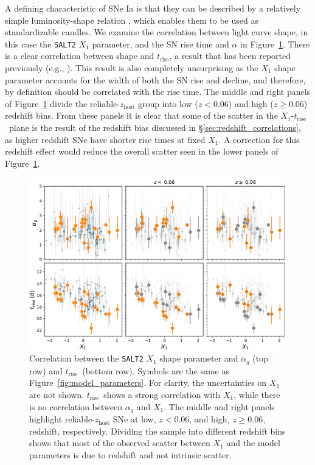 \documentclass[twocolumn]{./aastex63}
\newcommand{\trise}{$t_\mathrm{rise}$}
\begin{document}
A defining characteristic of SNe Ia is that they can be described by a
relatively simple luminosity-shape relation \citep{Phillips93}, which enables
them to be used as standardizable candles. We examine the correlation between
light curve shape, in this case the \texttt{SALT2} $X_1$ parameter, and the SN
rise time and $\alpha$ in Figure~\ref{fig:shape_correlations}. There is a
clear correlation between shape and \trise, a result that has been reported
previously (e.g., \citealt{Riess99a,Firth15,Zheng17a}). This result is also
completely unsurprising as the $X_1$ shape parameter accounts for the width of
both the SN rise and decline, and therefore, by definition should be
correlated with the rise time. The middle and right panels of
Figure~\ref{fig:shape_correlations} divide the reliable-$z_\mathrm{host}$
group into low ($z < 0.06$) and high ($z \ge 0.06$) redshift bins. From these
panels it is clear that some of the scatter in the $X_1$-\trise\ plane is the
result of the redshift bias discussed in \S\ref{sec:redshift_correlations}, as
higher redshift SNe have shorter rise times at fixed $X_1$. A correction for
this redshift effect would reduce the overall scatter seen in the lower panels
of Figure~\ref{fig:shape_correlations}.

\begin{figure}
    \centering
    \includegraphics[width=6in]{./figures/shape_correlations.pdf}
    \caption{Correlation between the \texttt{SALT2} $X_1$ shape parameter and
    $\alpha_g$ (top row) and \trise\ (bottom row). Symbols are the same as
    Figure~\ref{fig:model_parameters}. For clarity, the uncertainties on $X_1$
    are not shown. \trise\ shows a strong correlation with $X_1$, while there
    is no correlation between $\alpha_g$ and $X_1$. The middle and right
    panels highlight reliable-$z_\mathrm{host}$ SNe at low, $z < 0.06$, and
    high, $z \ge 0.06$, redshift, respectively. Dividing the sample into
    different redshift bins shows that most of the observed scatter between
    $X_1$ and the model parameters is due to redshift and not intrinsic
    scatter. }
    \label{fig:shape_correlations}
\end{figure}
\end{document}
